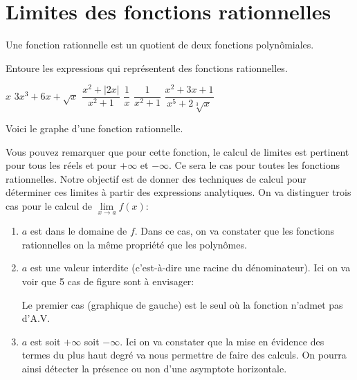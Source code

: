 \documentclass[a4paper,12pt]{report}
\newcommand{\pinf}{+\infty}
\newcommand{\minf}{-\infty}
\newcommand{\abs}[1]{|#1|}
\begin{document}
\section{Limites des fonctions rationnelles}
\label{sec:org09f5008}
Une fonction rationnelle est un quotient de deux fonctions
polynômiales.

\begin{exercice}
Entoure les expressions qui représentent des fonctions rationnelles.
\begin{center}
\(x\) \hspace{0.5cm}             \(3x^3+6x+\sqrt{x}\) \hspace{0.5cm}  \(\dfrac{x^2+\abs{2x}}{x^2+1}\)
 \hspace{0.5cm}\(\dfrac{1}{x}\) \hspace{0.5cm} \(\dfrac{1}{x^2+1}\) \hspace{0.5cm} \(\dfrac{x^2+3x+1}{x^5+2\sqrt[3]{x}}\)
\end{center}
\end{exercice}

Voici le graphe d'une fonction rationnelle.
\begin{center}

\end{center}

Vous pouvez remarquer que pour cette fonction, le calcul de limites est
pertinent pour tous les réels et pour \(\pinf\) et \(\minf\). Ce sera le
cas pour toutes les fonctions rationnelles. Notre
objectif est de donner des techniques de calcul pour déterminer ces
limites à partir des expressions analytiques. On va distinguer trois
cas pour le calcul de \(\lim\limits_{x\to a}f(x)\):
\begin{enumerate}
\item \(a\) est dans le domaine de \(f\). Dans ce cas, on va constater que
les fonctions rationnelles on la même propriété que les polynômes.
\item \(a\) est une valeur interdite (c'est-à-dire une racine du
dénominateur). Ici on va voir que 5 cas de figure sont à
envisager:

\begin{center}

\end{center}
Le premier cas (graphique de gauche) est le seul où la fonction n'admet pas d'A.V.

\item \(a\) est soit \(\pinf\) soit \(\minf\). Ici on va constater que la mise
en évidence des termes du plus haut degré va nous permettre de
faire des calculs. On pourra ainsi détecter la présence ou non
d'une asymptote horizontale.

\begin{center}

\end{center}
\end{enumerate}
\end{document}
